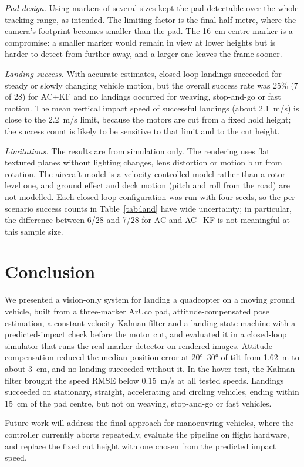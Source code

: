 \documentclass[conference]{IEEEtran}
\begin{document}
\emph{Pad design.} Using markers of several sizes kept the pad detectable over the whole
tracking range, as intended. The limiting factor is the final half metre, where the camera's
footprint becomes smaller than the pad. The \SI{16}{cm} centre marker is a compromise: a
smaller marker would remain in view at lower heights but is harder to detect from further
away, and a larger one leaves the frame sooner.

\emph{Landing success.} With accurate estimates, closed-loop landings succeeded for steady or
slowly changing vehicle motion, but the overall success rate was 25\% (7 of 28) for AC+KF and
no landings occurred for weaving, stop-and-go or fast motion. The mean vertical impact speed of
successful landings (about \SI{2.1}{m/s}) is close to the \SI{2.2}{m/s} limit, because the
motors are cut from a fixed hold height; the success count is likely to be sensitive to that limit
and to the cut height.

\emph{Limitations.} The results are from simulation only. The rendering uses flat textured
planes without lighting changes, lens distortion or motion blur from rotation. The aircraft
model is a velocity-controlled model rather than a rotor-level one, and ground effect and
deck motion (pitch and roll from the road) are not modelled. Each closed-loop configuration
was run with four seeds, so the per-scenario success counts in Table~\ref{tab:land} have
wide uncertainty; in particular, the difference between 6/28 and 7/28 for AC and AC+KF is not
meaningful at this sample size.

\section{Conclusion}
We presented a vision-only system for landing a quadcopter on a moving ground vehicle, built
from a three-marker ArUco pad, attitude-compensated pose estimation, a constant-velocity
Kalman filter and a landing state machine with a predicted-impact check before the motor cut,
and evaluated it in a closed-loop simulator that runs the real marker detector on rendered
images. Attitude compensation reduced the median position error at \ang{20}--\ang{30} of tilt
from \SI{1.62}{m} to about \SI{3}{cm}, and no landing succeeded without it. In the hover
test, the Kalman filter brought the speed RMSE below \SI{0.15}{m/s} at all tested speeds. Landings
succeeded on stationary, straight, accelerating and circling vehicles, ending within
\SI{15}{cm} of the pad centre, but not on weaving, stop-and-go or fast vehicles.

Future work will address the final approach for manoeuvring vehicles, where the controller
currently aborts repeatedly, evaluate the pipeline on flight hardware, and replace the fixed
cut height with one chosen from the predicted impact speed.



\end{document}
